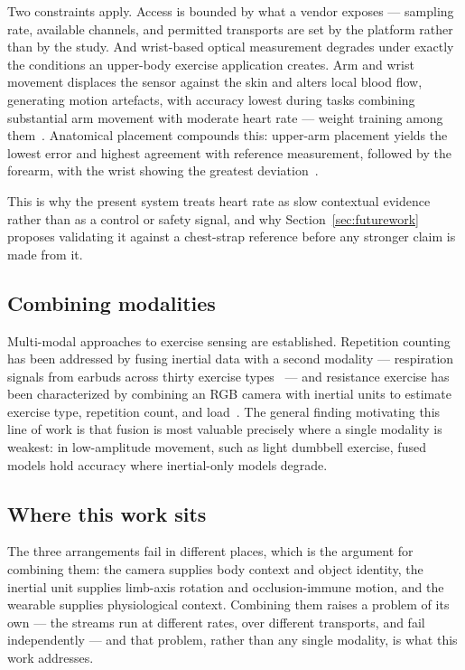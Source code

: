 \documentclass[11pt,a4paper]{article}
\begin{document}
Two constraints apply. Access is bounded by what a vendor exposes --- sampling
rate, available channels, and permitted transports are set by the platform
rather than by the study. And wrist-based optical measurement degrades under
exactly the conditions an upper-body exercise application creates. Arm and wrist
movement displaces the sensor against the skin and alters local blood flow,
generating motion artefacts, with accuracy lowest during tasks combining
substantial arm movement with moderate heart rate --- weight training among
them~\cite{ppgvalid}. Anatomical placement compounds this: upper-arm placement
yields the lowest error and highest agreement with reference measurement,
followed by the forearm, with the wrist showing the greatest
deviation~\cite{ppgplace}.

This is why the present system treats heart rate as slow contextual evidence
rather than as a control or safety signal, and why Section~\ref{sec:futurework}
proposes validating it against a chest-strap reference before any stronger claim
is made from it.

\subsection{Combining modalities}

Multi-modal approaches to exercise sensing are established. Repetition counting
has been addressed by fusing inertial data with a second modality --- respiration
signals from earbuds across thirty exercise types~\cite{multimodalrep} --- and
resistance exercise has been characterized by combining an RGB camera with
inertial units to estimate exercise type, repetition count, and
load~\cite{rgbimu}. The general finding motivating this line of work is that
fusion is most valuable precisely where a single modality is weakest: in
low-amplitude movement, such as light dumbbell exercise, fused models hold
accuracy where inertial-only models degrade.

\subsection{Where this work sits}

The three arrangements fail in different places, which is the argument for
combining them: the camera supplies body context and object identity, the
inertial unit supplies limb-axis rotation and occlusion-immune motion, and the
wearable supplies physiological context. Combining them raises a problem of its
own --- the streams run at different rates, over different transports, and fail
independently --- and that problem, rather than any single modality, is what
this work addresses.
\end{document}
